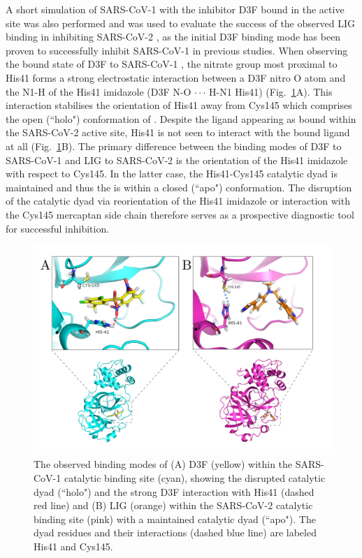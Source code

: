 A short simulation of SARS-CoV-1 \mpro with the inhibitor D3F bound in the active site was also performed and was used to evaluate the success of the observed LIG binding in inhibiting SARS-CoV-2 \mpro\!\!, as the initial D3F binding mode has been proven to successfully inhibit SARS-CoV-1 \mpro in previous studies.\cite{d3f} When observing the bound state of D3F to SARS-CoV-1 \mpro\!\!, the nitrate group most proximal to His41 forms a strong electrostatic interaction between a D3F nitro O atom and the N1-H of the His41 imidazole (D3F N-O $\cdot\cdot\cdot$ H-N1 His41) (Fig.~\ref{fig:bound_structures}A). This interaction stabilises the orientation of His41 away from Cys145 which comprises the open (``holo") conformation of \mpro\!\!. Despite the ligand appearing as bound within the SARS-CoV-2 \mpro active site, His41 is not seen to interact with the bound ligand at all (Fig.~\ref{fig:bound_structures}B). The primary difference between the binding modes of D3F to SARS-CoV-1 \mpro and LIG to SARS-CoV-2 \mpro is the orientation of the His41 imidazole with respect to Cys145. In the latter case, the His41-Cys145 catalytic dyad is maintained and thus the \mpro is within a closed (``apo") conformation. The disruption of the catalytic dyad via reorientation of the His41 imidazole or interaction with the Cys145 mercaptan side chain\cite{jin2020structure} therefore serves as a prospective diagnostic tool for successful inhibition.
%
\begin{figure}
    \centering
    \includegraphics[width=\linewidth]{figures/side_by_side_labeled.pdf}
    \caption{The observed binding modes of (A) D3F (yellow) within the SARS-CoV-1 \mpro catalytic binding site (cyan), showing the disrupted catalytic dyad (``holo") and the strong D3F interaction with His41 (dashed red line) and (B) LIG (orange) within the SARS-CoV-2 \mpro catalytic binding site (pink) with a maintained catalytic dyad (``apo"). The dyad residues and their interactions (dashed blue line) are labeled His41 and Cys145.}
    \label{fig:bound_structures}
\end{figure}
